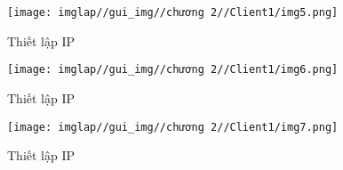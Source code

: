 \documentclass[13pt]{article}
\begin{document}
\begin{itemize}
\begin{itemize}
                        \begin{figure}[H]
                            \centering
                            \begin{minipage}{0.45\linewidth}
                                \centering
                                \texttt{[image: imglap//gui\_img//chương 2//Client1/img5.png]}
                                \caption{Thiết lập IP}
                                \label{fig:enter-label1}
                            \end{minipage}
                            \hfill
                            \begin{minipage}{0.45\linewidth}
                                \centering
                                \texttt{[image: imglap//gui\_img//chương 2//Client1/img6.png]}
                                \caption{Thiết lập IP}
                                \label{fig:enter-label2}
                            \end{minipage}
                        \end{figure}

                        \begin{figure}[H]
                            \centering
                            \texttt{[image: imglap//gui\_img//chương 2//Client1/img7.png]}
                            \caption{Thiết lập IP}
                            \label{fig:enter-label}
                        \end{figure}
                        \end{itemize}
                        
                 \end{itemize}
\newpage
\end{document}
